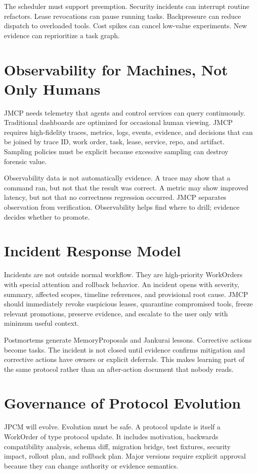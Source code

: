 \documentclass[10pt,journal,onecolumn]{IEEEtran}
\begin{document}
The scheduler must support preemption. Security incidents can interrupt routine refactors. Lease revocations can pause running tasks. Backpressure can reduce dispatch to overloaded tools. Cost spikes can cancel low-value experiments. New evidence can reprioritize a task graph.

\section{Observability for Machines, Not Only Humans}
JMCP needs telemetry that agents and control services can query continuously. Traditional dashboards are optimized for occasional human viewing. JMCP requires high-fidelity traces, metrics, logs, events, evidence, and decisions that can be joined by trace ID, work order, task, lease, service, repo, and artifact. Sampling policies must be explicit because excessive sampling can destroy forensic value.

Observability data is not automatically evidence. A trace may show that a command ran, but not that the result was correct. A metric may show improved latency, but not that no correctness regression occurred. JMCP separates observation from verification. Observability helps find where to drill; evidence decides whether to promote.

\section{Incident Response Model}
Incidents are not outside normal workflow. They are high-priority WorkOrders with special attention and rollback behavior. An incident opens with severity, summary, affected scopes, timeline references, and provisional root cause. JMCP should immediately revoke suspicious leases, quarantine compromised tools, freeze relevant promotions, preserve evidence, and escalate to the user only with minimum useful context.

Postmortems generate MemoryProposals and Jankurai lessons. Corrective actions become tasks. The incident is not closed until evidence confirms mitigation and corrective actions have owners or explicit deferrals. This makes learning part of the same protocol rather than an after-action document that nobody reads.

\section{Governance of Protocol Evolution}
JPCM will evolve. Evolution must be safe. A protocol update is itself a WorkOrder of type protocol update. It includes motivation, backwards compatibility analysis, schema diff, migration bridge, test fixtures, security impact, rollout plan, and rollback plan. Major versions require explicit approval because they can change authority or evidence semantics.
\end{document}
